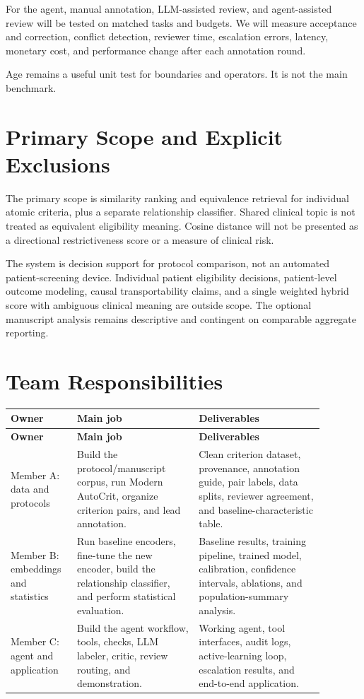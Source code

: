 \documentclass[11pt]{article}
\begin{document}
For the agent, manual annotation, LLM-assisted review, and agent-assisted review will be tested on matched tasks and budgets. We will measure acceptance and correction, conflict detection, reviewer time, escalation errors, latency, monetary cost, and performance change after each annotation round.

Age remains a useful unit test for boundaries and operators. It is not the main benchmark.

\section{Primary Scope and Explicit Exclusions}

The primary scope is similarity ranking and equivalence retrieval for individual atomic criteria, plus a separate relationship classifier. Shared clinical topic is not treated as equivalent eligibility meaning. Cosine distance will not be presented as a directional restrictiveness score or a measure of clinical risk.

The system is decision support for protocol comparison, not an automated patient-screening device. Individual patient eligibility decisions, patient-level outcome modeling, causal transportability claims, and a single weighted hybrid score with ambiguous clinical meaning are outside scope. The optional manuscript analysis remains descriptive and contingent on comparable aggregate reporting.

\section{Team Responsibilities}

\begin{longtable}{>{\raggedright\arraybackslash}p{0.17\linewidth} >{\raggedright\arraybackslash}p{0.35\linewidth} >{\raggedright\arraybackslash}p{0.36\linewidth}}
\toprule
\textbf{Owner} & \textbf{Main job} & \textbf{Deliverables} \\
\midrule
\endfirsthead
\toprule
\textbf{Owner} & \textbf{Main job} & \textbf{Deliverables} \\
\midrule
\endhead
Member A: data and protocols & Build the protocol/manuscript corpus, run Modern AutoCrit, organize criterion pairs, and lead annotation. & Clean criterion dataset, provenance, annotation guide, pair labels, data splits, reviewer agreement, and baseline-characteristic table. \\
\midrule
Member B: embeddings and statistics & Run baseline encoders, fine-tune the new encoder, build the relationship classifier, and perform statistical evaluation. & Baseline results, training pipeline, trained model, calibration, confidence intervals, ablations, and population-summary analysis. \\
\midrule
Member C: agent and application & Build the agent workflow, tools, checks, LLM labeler, critic, review routing, and demonstration. & Working agent, tool interfaces, audit logs, active-learning loop, escalation results, and end-to-end application. \\
\bottomrule
\end{longtable}
\end{document}
